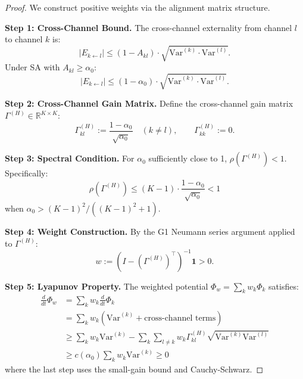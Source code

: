 \documentclass[12pt]{article}
\newcommand{\R}{\mathbb{R}}
\newcommand{\Var}{\mathrm{Var}}
\begin{document}
\begin{proof}
We construct positive weights via the alignment matrix structure.

\textbf{Step 1: Cross-Channel Bound.}
The cross-channel externality from channel $l$ to channel $k$ is:
\[
|E_{k \leftarrow l}| \leq (1 - A_{kl}) \cdot \sqrt{\Var^{(k)} \cdot \Var^{(l)}}.
\]
Under SA with $A_{kl} \geq \alpha_0$:
\[
|E_{k \leftarrow l}| \leq (1 - \alpha_0) \cdot \sqrt{\Var^{(k)} \cdot \Var^{(l)}}.
\]

\textbf{Step 2: Cross-Channel Gain Matrix.}
Define the cross-channel gain matrix $\Gamma^{(H)} \in \R^{K \times K}$:
\[
\Gamma^{(H)}_{kl} := \frac{1 - \alpha_0}{\sqrt{\alpha_0}} \quad (k \neq l), \qquad \Gamma^{(H)}_{kk} := 0.
\]

\textbf{Step 3: Spectral Condition.}
For $\alpha_0$ sufficiently close to 1, $\rho(\Gamma^{(H)}) < 1$. Specifically:
\[
\rho(\Gamma^{(H)}) \leq (K-1) \cdot \frac{1 - \alpha_0}{\sqrt{\alpha_0}} < 1
\]
when $\alpha_0 > (K-1)^2 / ((K-1)^2 + 1)$.

\textbf{Step 4: Weight Construction.}
By the G1 Neumann series argument applied to $\Gamma^{(H)}$:
\[
w := (I - (\Gamma^{(H)})^\top)^{-1} \mathbf{1} > 0.
\]

\textbf{Step 5: Lyapunov Property.}
The weighted potential $\Phi_w = \sum_k w_k \Phi_k$ satisfies:
\begin{align*}
\frac{d}{dt} \Phi_w &= \sum_k w_k \frac{d}{dt} \Phi_k \\
&= \sum_k w_k \left( \Var^{(k)} + \text{cross-channel terms} \right) \\
&\geq \sum_k w_k \Var^{(k)} - \sum_k \sum_{l \neq k} w_k \Gamma^{(H)}_{kl} \sqrt{\Var^{(k)} \Var^{(l)}} \\
&\geq c(\alpha_0) \sum_k w_k \Var^{(k)} \geq 0
\end{align*}
where the last step uses the small-gain bound and Cauchy-Schwarz.
\end{proof}
\end{document}
